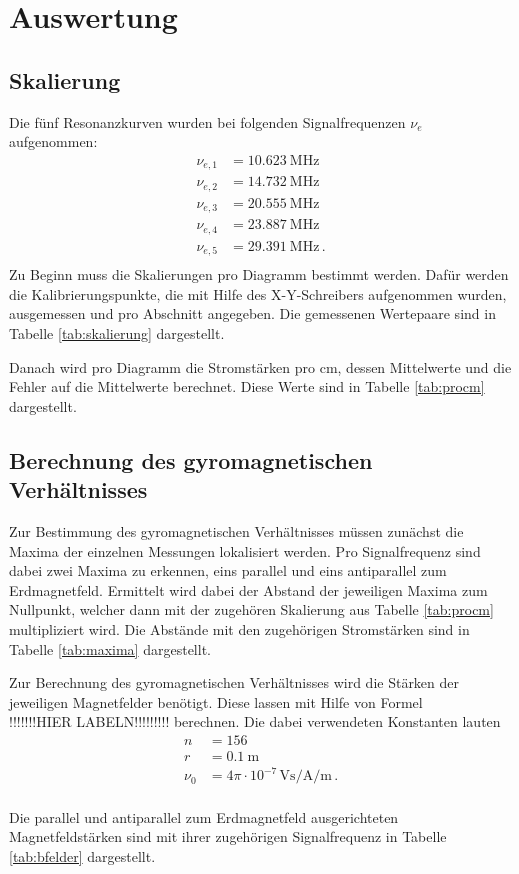 \section{Auswertung}
\subsection{Skalierung}
Die fünf Resonanzkurven wurden bei folgenden Signalfrequenzen $\nu_e$ aufgenommen:
\begin{align*}
  \nu_{e, 1} &= \SI{10.623}{\mega\hertz} \\
  \nu_{e, 2} &= \SI{14.732}{\mega\hertz} \\
  \nu_{e, 3} &= \SI{20.555}{\mega\hertz} \\
  \nu_{e, 4} &= \SI{23.887}{\mega\hertz} \\
  \nu_{e, 5} &= \SI{29.391}{\mega\hertz}\, . \\
\end{align*}
Zu Beginn muss die Skalierungen pro Diagramm bestimmt werden. Dafür
werden die Kalibrierungspunkte, die mit Hilfe des X-Y-Schreibers aufgenommen wurden,
ausgemessen
und pro Abschnitt angegeben. Die gemessenen Wertepaare sind in Tabelle
\ref{tab:skalierung} dargestellt.


Danach wird pro Diagramm die Stromstärken pro $\si{\centi\meter}$, dessen
Mittelwerte und die Fehler auf die Mittelwerte berechnet. Diese Werte sind
in Tabelle \ref{tab:procm} dargestellt.



\subsection{Berechnung des gyromagnetischen Verhältnisses}
Zur Bestimmung des gyromagnetischen Verhältnisses müssen zunächst die Maxima
der einzelnen Messungen lokalisiert werden. Pro Signalfrequenz sind dabei zwei
Maxima zu erkennen, eins parallel und eins antiparallel zum Erdmagnetfeld.
Ermittelt wird dabei der Abstand der jeweiligen Maxima zum Nullpunkt, welcher
dann mit der zugehören Skalierung aus Tabelle \ref{tab:procm} multipliziert
wird. Die Abstände mit den zugehörigen Stromstärken sind in Tabelle
\ref{tab:maxima} dargestellt.



Zur Berechnung des gyromagnetischen Verhältnisses wird die Stärken der jeweiligen
Magnetfelder benötigt. Diese lassen mit Hilfe von Formel\\
 !!!!!!!HIER LABELN!!!!!!!!!
berechnen. Die dabei verwendeten Konstanten \cite{skript} \cite{indu} lauten
\begin{align*}
  n &= 156 \\
  r &= \SI{0.1}{\meter} \\
  \nu_0 &= 4 \pi \cdot 10^{-7}\, \si{\volt\second\per\ampere\per\meter} \, .\\
\end{align*}

Die parallel und antiparallel zum Erdmagnetfeld ausgerichteten Magnetfeldstärken
sind mit ihrer zugehörigen Signalfrequenz in Tabelle \ref{tab:bfelder} dargestellt.


